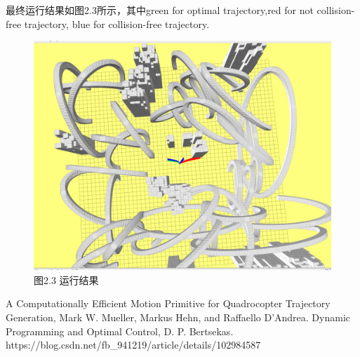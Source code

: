 \documentclass[40pt,a4paper,UTF8]{ctexart}
\numberwithin{equation}{section}
\begin{document}
最终运行结果如图2.3所示，其中green for optimal trajectory,red for not collision-free trajectory,
blue for collision-free trajectory.
\begin{figure}[H]
    \centering
    \includegraphics[width=4.8in]{ch4_15.png} {图2.3 运行结果}
\end{figure}


\begin{thebibliography}{99}  
A Computationally Efficient Motion Primitive for Quadrocopter Trajectory Generation, Mark W. Mueller, Markus Hehn, and Raffaello D’Andrea.
Dynamic Programming and Optimal Control, D. P. Bertsekas.
https://blog.csdn.net/fb\_941219/article/details/102984587
\end{thebibliography}
\end{document}
